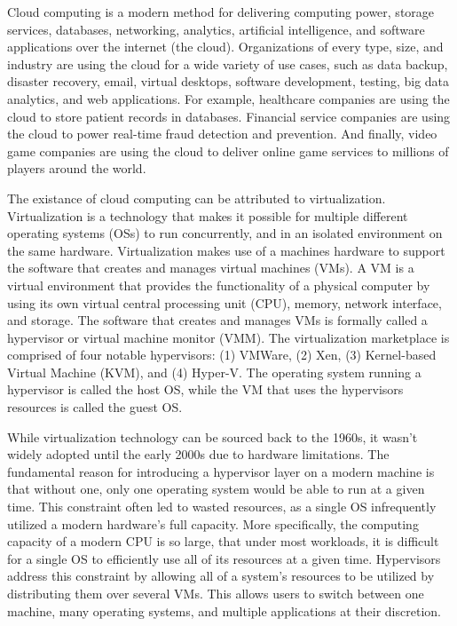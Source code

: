 \documentclass{report}
\begin{document}
\begin{spacing}{1.5}
{\large
Cloud computing is a modern method for delivering computing power, storage services, databases, networking, analytics, artificial intelligence, and software applications over the internet (the cloud). Organizations of every type, size, and industry are using the cloud for a wide variety of use cases, such as data backup, disaster recovery, email, virtual desktops, software development, testing, big data analytics, and web applications. For example, healthcare companies are using the cloud to store patient records in databases. Financial service companies are using the cloud to power real-time fraud detection and prevention. And finally, video game companies are using the cloud to deliver online game services to millions of players around the world.
\newline
}

{\large
The existance of cloud computing can be attributed to virtualization. Virtualization is a technology that makes it possible for multiple different operating systems (OSs) to run concurrently, and in an isolated environment on the same hardware. Virtualization makes use of a machines hardware to support the software that creates and manages virtual machines (VMs). A VM is a virtual environment that provides the functionality of a physical computer by using its own virtual central processing unit (CPU), memory, network interface, and storage. The software that creates and manages VMs is formally called a hypervisor or virtual machine monitor (VMM). The virtualization marketplace is comprised of four notable hypervisors: (1) VMWare, (2) Xen, (3) Kernel-based Virtual Machine (KVM), and (4) Hyper-V. The operating system running a hypervisor is called the host OS, while the VM that uses the hypervisors resources is called the guest OS.
\newline
}

{\large
While virtualization technology can be sourced back to the 1960s, it wasn’t widely adopted until the early 2000s due to hardware limitations. The fundamental reason for introducing a hypervisor layer on a modern machine is that without one, only one operating system would be able to run at a given time. This constraint often led to wasted resources, as a single OS infrequently utilized a modern hardware’s full capacity. More specifically, the computing capacity of a modern CPU is so large, that under most workloads, it is difficult for a single OS to efficiently use all of its resources at a given time. Hypervisors address this constraint by allowing all of a system’s resources to be utilized by distributing them over several VMs. This allows users to switch between one machine, many operating systems, and multiple applications at their discretion.
\newline
}


\end{spacing}
\end{document}
